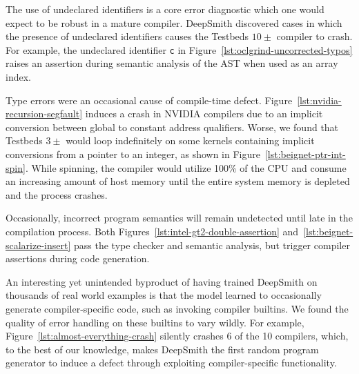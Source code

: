 The use of undeclared identifiers is a core error diagnostic which one would expect to be robust in a mature compiler. DeepSmith discovered cases in which the presence of undeclared identifiers causes the Testbeds $10\pm$ compiler to crash. For example, the undeclared identifier \texttt{c} in Figure~\ref{lst:oclgrind-uncorrected-typos} raises an assertion during semantic analysis of the AST when used as an array index.

Type errors were an occasional cause of compile-time defect. Figure~\ref{lst:nvidia-recursion-segfault} induces a crash in NVIDIA compilers due to an implicit conversion between global to constant address qualifiers. Worse, we found that Testbeds $3\pm$ would loop indefinitely on some kernels containing implicit conversions from a pointer to an integer, as shown in Figure~\ref{lst:beignet-ptr-int-spin}. While spinning, the compiler would utilize 100\% of the CPU and consume an increasing amount of host memory until the entire system memory is depleted and the process crashes. %

Occasionally, incorrect program semantics will remain undetected until late in the compilation process. Both Figures~\ref{lst:intel-gt2-double-assertion} and~\ref{lst:beignet-scalarize-insert} pass the type checker and semantic analysis, but trigger compiler assertions during code generation.

An interesting yet unintended byproduct of having trained DeepSmith on thousands of real world examples is that the model learned to occasionally generate compiler-specific code, such as invoking compiler builtins. We found the quality of error handling on these builtins to vary wildly. For example, Figure~\ref{lst:almost-everything-crash} silently crashes 6 of the 10 compilers, which, to the best of our knowledge, makes DeepSmith the first random program generator to induce a defect through exploiting compiler-specific functionality.


